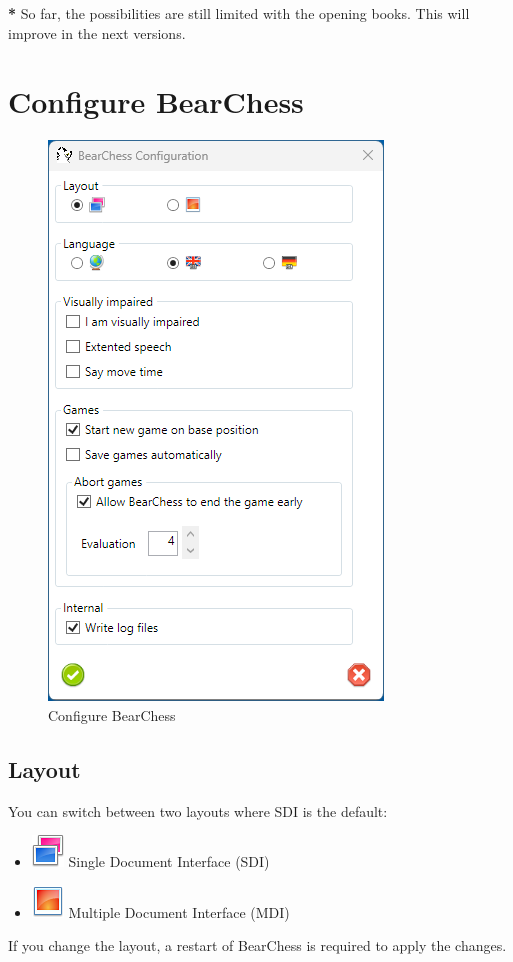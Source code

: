 \documentclass[11pt,a4paper]{article}
\begin{document}
	{\color{red}\textbf{*}} So far, the possibilities are still limited with the opening books. This will improve in the next versions. 
	
	\section{Configure BearChess} \label{ConfigureBearChess}
	
	\begin{figure}[H]
		\centering
		\includegraphics[scale=1.0]{ConfigureBearChess.png}
		\caption{Configure BearChess}
		\label{fig:ConfigureBearChess}
	\end{figure}
	

	\subsection{Layout}
	You can switch between two layouts where SDI is the default:
	\begin{itemize}
		\item \includegraphics[scale=0.5]{images_flickr.png} Single Document Interface (SDI)
		\item \includegraphics[scale=0.5]{image.png} Multiple Document Interface (MDI)			
	\end{itemize}
	If you change the layout, a restart of BearChess is required to apply the changes.
	
\end{document}
